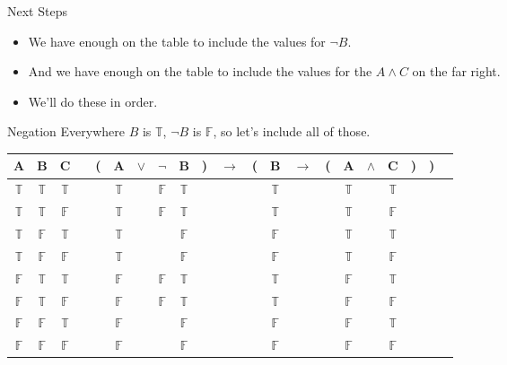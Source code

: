 \documentclass[
  ignorenonframetext,
]{beamer}
\providecommand{\tightlist}{%
  \setlength{\itemsep}{0pt}\setlength{\parskip}{0pt}}
\renewcommand{\,}{\text{, }}
\def\True{\mathbb{T}}
\def\False{\mathbb{F}}
\begin{document}
\begin{frame}{Next Steps}
\protect\hypertarget{next-steps}{}
\begin{itemize}
\tightlist
\item
  We have enough on the table to include the values for \(\neg B\).
\item
  And we have enough on the table to include the values for the
  \(A \wedge C\) on the far right.
\item
  We'll do these in order.
\end{itemize}
\end{frame}

\begin{frame}{Negation}
\protect\hypertarget{negation}{}
Everywhere \(B\) is \(\True\), \(\neg B\) is \(\False\), so let's
include all of those.

\begin{center}
\begin{tabular}{@{ }c@{ }@{ }c@{ }@{ }c | c@{ }@{}c@{}@{ }c@{ }@{ }c@{ }@{ }c@{ }@{ }c@{ }@{}c@{}@{ }c@{ }@{}c@{}@{ }c@{ }@{ }c@{ }@{}c@{}@{ }c@{ }@{ }c@{ }@{ }c@{ }@{}c@{}@{}c@{}@{ }c}
A & B & C &  & ( & A & $\vee$ & $\neg$ & B & ) & $\rightarrow$ & ( & B & $\rightarrow$ & ( & A & $\wedge$ & C & ) & ) & \\
\hline 
 $\True$ & $\True$ & $\True$ &  &  & $\True$ && $\False$ & $\True$ &  &&  & $\True$ &&  & $\True$ && $\True$ &  &  & \\
 $\True$ & $\True$ & $\False$ &  &  & $\True$ && $\False$ & $\True$ &  &&  & $\True$ &&  & $\True$ && $\False$ &  &  & \\
 $\True$ & $\False$ & $\True$ &  &  & $\True$ &&& $\False$ &  &&  & $\False$ &&  & $\True$ && $\True$ &  &  & \\
 $\True$ & $\False$ & $\False$ &  &  & $\True$ &&& $\False$ &  &&  & $\False$ &&  & $\True$ && $\False$ &  &  & \\
 $\False$ & $\True$ & $\True$ &  &  & $\False$ && $\False$ & $\True$ &  &&  & $\True$ &&  & $\False$ && $\True$ &  &  & \\
 $\False$ & $\True$ & $\False$ &  &  & $\False$ && $\False$ & $\True$ &  &&  & $\True$ &&  & $\False$ && $\False$ &  &  & \\
 $\False$ & $\False$ & $\True$ &  &  & $\False$ &&& $\False$ &  &&  & $\False$ &&  & $\False$ && $\True$ &  &  & \\
 $\False$ & $\False$ & $\False$ &  &  & $\False$ &&& $\False$ &  &&  & $\False$ &&  & $\False$ && $\False$ &  &  & \\
\end{tabular}
\end{center}
\end{frame}
\end{document}
